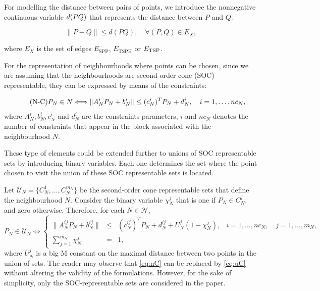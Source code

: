 \documentclass[a4paper,  review, authoryear, 1p.]{elsarticle}
\newcommand{\ESPP}{{E_{\text{SPP}}}}
\newcommand{\ETSPH}{{E_{\text{TSPH}}}}
\begin{document}
	\newcommand{\dvar}[2]{d(#1#2)}
	
	For modelling the distance between pairs of points, we introduce the nonnegative continuous variable $\dvar{PQ}$ that represents the distance between $P$ and $Q$:
	
	
	\begin{equation*}\tag{d-C}\label{eq:dC}
		\|P - Q\|\leq \dvar{P}{Q},\quad\forall (P,Q)\in E_X,
	\end{equation*}
	
	where $E_X$ is the set of edges $\ESPP$, $\ETSPH$ or $E_{\rm{TSP}}$.
	
	For the representation of neighbourhoods where points can be chosen, since we are assuming that the neighbourhoods are second-order cone (SOC) representable, they can be expressed by means of the constraints:
	
	\begin{equation*}\tag{N-C}\label{eq:nC}
		P_N\in N \Longleftrightarrow
		\|A_N^i P_N + b_N^i\| \leq (c_N^i)^T P_N + d_N^i,\quad i=1,\ldots,nc_N, \\
	\end{equation*}
	where $A_N^i, b_N^i, c_N^i$ and $d_N^i$ are the constraints parameters, $i$ and $nc_N$ denotes the number of constraints that appear in the block associated with the neighbourhood $N$.
	
	
	These type of elements could be extended further to unions of SOC representable sets by introducing binary variables. Each one determines the set where the point chosen to visit the union of these SOC representable sets is located.
	
	Let $\mathcal U_N=\{C^1_N, \ldots, C^{m_N}_N\}$ be the second-order cone representable sets that define the neighbourhood $N$. Consider the binary variable $\chi_{N}^{j}$ that is one if $P_N\in C^j_N$, and zero otherwise.
	Therefore, for each $N\in \mathcal N$,
	\begin{equation}\label{eq:uC}\tag{U-C}
		P_N\in \mathcal U_N \Longleftrightarrow
		\left\{
		\begin{array}{cclr}
			\|A_N^{ij} P_N + b_N^{ij}\|& \leq & (c_N^{ij})^T P_N + d_N^{ij}+ U_N^{j}(1-\chi_N^{j}), & i=1,\ldots,nc_N,\quad j=1,\ldots,m_N, \\
			\sum_{j = 1}^{m_N} \chi_N^{j} & =    & 1,
		\end{array}
		\right.
	\end{equation}
	where $U_N^j$ is a big M constant on the maximal distance between two points in the union of sets.
	The reader may observe that \eqref{eq:nC} can be replaced by \eqref{eq:uC} without altering the validity of the formulations. However, for the sake of simplicity, only the SOC-representable sets are considered in the paper.
	
\end{document}
